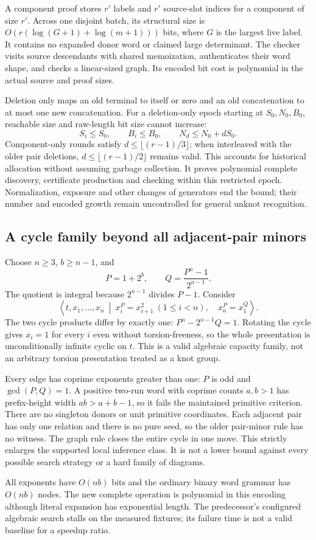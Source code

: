 A component proof stores $r'$ labels and $r'$ source-slot indices for a
component of size $r'$. Across one disjoint batch, its structural size is
$O(r(\log(G+1)+\log(m+1)))$ bits, where $G$ is the largest live label.
It contains no expanded donor word or claimed large determinant. The checker
visits source descendants with shared memoization, authenticates their word
shape, and checks a linear-sized graph. Its encoded bit cost is polynomial
in the actual source and proof sizes.

Deletion only maps an old terminal to itself or zero and an old concatenation
to at most one new concatenation. For a deletion-only epoch starting at
$S_0,N_0,B_0$, reachable size and raw-length bit size cannot increase:
\[
 S_i\le S_0,\qquad B_i\le B_0,\qquad N_d\le N_0+dS_0.
\]
Component-only rounds satisfy $d\le\lfloor(r-1)/3\rfloor$; when interleaved
with the older pair deletions, $d\le\lfloor(r-1)/2\rfloor$ remains valid.
This accounts for historical allocation without assuming garbage collection.
It proves polynomial complete discovery, certificate production and checking
within this restricted epoch. Normalization, exposure and other changes of
generators end the bound; their number and encoded growth remain uncontrolled
for general unknot recognition.

\subsection{A cycle family beyond all adjacent-pair minors}

Choose $n\ge3$, $b\ge n-1$, and
\[
 P=1+2^b,\qquad Q=\frac{P^n-1}{2^{n-1}}.
\]
The quotient is integral because $2^{n-1}$ divides $P-1$. Consider
\[
 \left\langle t,x_1,\ldots,x_n\ \middle|\
 x_i^P=x_{i+1}^2\ (1\le i<n),\quad x_n^P=x_1^Q
 \right\rangle.
\]
The two cycle products differ by exactly one:
$P^n-2^{n-1}Q=1$. Rotating the cycle gives $x_i=1$ for every $i$ even
without torsion-freeness, so the whole presentation is unconditionally
infinite cyclic on $t$. This is a valid algebraic capacity family, not an
arbitrary torsion presentation treated as a knot group.

Every edge has coprime exponents greater than one: $P$ is odd and
$\gcd(P,Q)=1$. A positive two-run word with coprime counts $a,b>1$ has
prefix-height width $ab>a+b-1$, so it fails the maintained primitive criterion.
There are no singleton donors or unit primitive coordinates. Each adjacent
pair has only one relation and there is no pure seed, so the older pair-minor
rule has no witness. The graph rule closes the entire cycle in one move.
This strictly enlarges the supported local inference class. It is not a lower
bound against every possible search strategy or a hard family of diagrams.

All exponents have $O(nb)$ bits and the ordinary binary word grammar has
$O(nb)$ nodes. The new complete operation is polynomial in this encoding
although literal expansion has exponential length. The predecessor's configured
algebraic search stalls on the measured fixtures; its failure time is not a
valid baseline for a speedup ratio.


